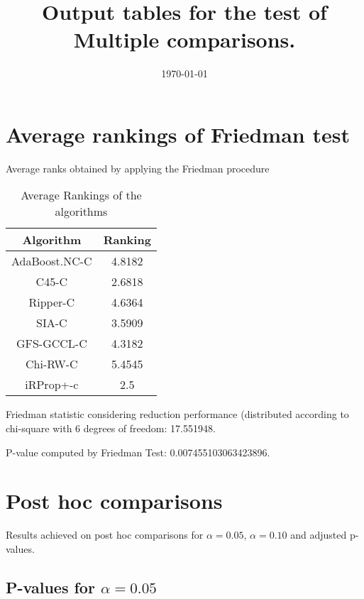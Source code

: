 \documentclass[a4paper,10pt]{article}
\title{Output tables for the test of Multiple comparisons.}
\author{}
\date{\today}
\begin{document}
\pagestyle{empty}
\maketitle
\thispagestyle{empty}
\section{Average rankings of Friedman test}



Average ranks obtained by applying the Friedman procedure

\begin{table}[!htp]
\centering
\begin{tabular}{|c|c|}\hline
Algorithm&Ranking\\\hline
AdaBoost.NC-C & 4.8182\\
C45-C & 2.6818\\
Ripper-C & 4.6364\\
SIA-C & 3.5909\\
GFS-GCCL-C & 4.3182\\
Chi-RW-C & 5.4545\\
iRProp+-c & 2.5\\
\hline
\end{tabular}
\caption{Average Rankings of the algorithms}
\end{table}

Friedman statistic considering reduction performance (distributed according to chi-square with 6 degrees of freedom: 17.551948.

P-value computed by Friedman Test: 0.007455103063423896.\newline



\pagebreak

\section{Post hoc comparisons}

Results achieved on post hoc comparisons for $\alpha = 0.05$, $\alpha = 0.10$ and adjusted p-values.

\subsection{P-values for $\alpha=0.05$}
\end{document}
